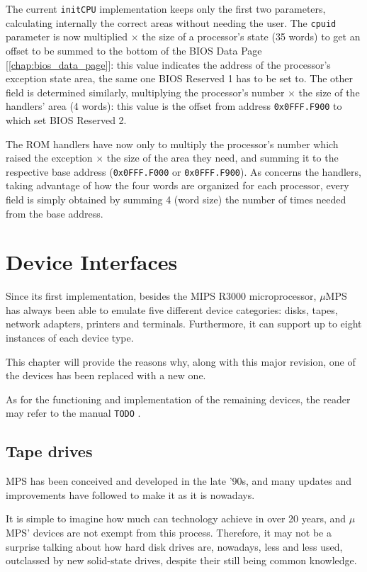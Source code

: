 \documentclass[12pt,a4paper,openright,twoside]{report}
\begin{document}
The current \texttt{initCPU} implementation keeps only the first two parameters, calculating internally the correct areas without needing the user.
The \texttt{cpuid} parameter is now multiplied $\times$ the size of a processor's state (35 words) to get an offset to be summed to the bottom of the BIOS Data Page [\autoref{chap:bios_data_page}]: this value indicates the address of the processor's exception state area, the same one BIOS Reserved 1 has to be set to.
The other field is determined similarly, multiplying the processor's number $\times$ the size of the handlers' area (4 words): this value is the offset from address \texttt{0x0FFF.F900} to which set BIOS Reserved 2.

The ROM handlers have now only to multiply the processor's number which raised the exception $\times$ the size of the area they need, and summing it to the respective base address (\texttt{0x0FFF.F000} or \texttt{0x0FFF.F900}).
As concerns the handlers, taking advantage of how the four words are organized for each processor, every field is simply obtained by summing 4 (word size) the number of times needed from the base address.

\chapter{Device Interfaces}
\lhead[\fancyplain{}{\bfseries\thepage}]{\fancyplain{}{\bfseries\rightmark}}
Since its first implementation, besides the MIPS R3000 microprocessor, $\mu$MPS has always been able to emulate five different device categories: disks, tapes, network adapters, printers and terminals.
Furthermore, it can support up to eight instances of each device type.

This chapter will provide the reasons why, along with this major revision, one of the devices has been replaced with a new one.

As for the functioning and implementation of the remaining devices, the reader may refer to the manual \texttt{TODO} \cite{pops}.

\section{Tape drives}
MPS has been conceived and developed in the late '90s, and many updates and improvements have followed to make it as it is nowadays.

It is simple to imagine how much can technology achieve in over 20 years, and $\mu$MPS' devices are not exempt from this process.
Therefore, it may not be a surprise talking about how hard disk drives are, nowadays, less and less used, outclassed by new solid-state drives, despite their still being common knowledge.
\end{document}
